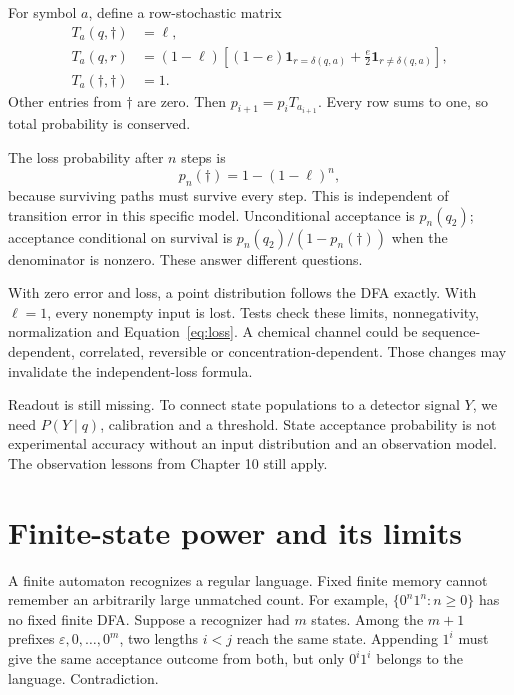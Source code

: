 For symbol $a$, define a row-stochastic matrix
\begin{align}
 T_a(q,\dagger)&=\ell,\\
 T_a(q,r)&=(1-\ell)\left[(1-e)\mathbf1_{r=\delta(q,a)}
       +\frac e2\mathbf1_{r\ne\delta(q,a)}\right],\\
 T_a(\dagger,\dagger)&=1.
\end{align}
Other entries from $\dagger$ are zero. Then $p_{i+1}=p_iT_{a_{i+1}}$.
Every row sums to one, so total probability is conserved.

The loss probability after $n$ steps is
\begin{equation}
 p_n(\dagger)=1-(1-\ell)^n,
 \label{eq:loss}
\end{equation}
because surviving paths must survive every step. This is independent of
transition error in this specific model. Unconditional acceptance is $p_n(q_2)$;
acceptance conditional on survival is
$p_n(q_2)/(1-p_n(\dagger))$ when the denominator is nonzero.
These answer different questions.

With zero error and loss, a point distribution follows the DFA exactly.
With $\ell=1$, every nonempty input is lost. Tests check these limits,
nonnegativity, normalization and Equation~\ref{eq:loss}.
A chemical channel could be sequence-dependent, correlated, reversible or
concentration-dependent. Those changes may invalidate the independent-loss formula.

Readout is still missing. To connect state populations to a detector signal $Y$,
we need $P(Y\mid q)$, calibration and a threshold. State acceptance probability
is not experimental accuracy without an input distribution and an observation
model. The observation lessons from Chapter 10 still apply.

\section{Finite-state power and its limits}
A finite automaton recognizes a regular language. Fixed finite memory cannot
remember an arbitrarily large unmatched count. For example,
$\{0^n1^n:n\geq0\}$ has no fixed finite DFA. Suppose a recognizer had $m$ states.
Among the $m+1$ prefixes $\varepsilon,0,\ldots,0^m$, two lengths $i<j$
reach the same state. Appending $1^i$ must give the same acceptance outcome
from both, but only $0^i1^i$ belongs to the language. Contradiction.

